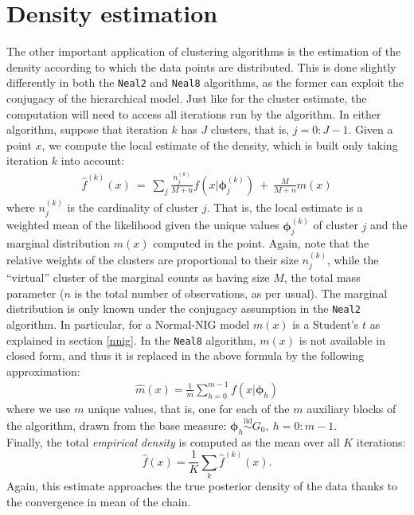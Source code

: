 \section{Density estimation}
The other important application of clustering algorithms is the estimation of the density according to which the data points are distributed.
This is done slightly differently in both the \verb|Neal2| and \verb|Neal8| algorithms, as the former can exploit the conjugacy of the hierarchical model.
Just like for the cluster estimate, the computation will need to access all iterations run by the algorithm.
In either algorithm, suppose that iteration $k$ has $J$ clusters, that is, $j=0:J-1$.
Given a point $x$, we compute the local estimate of the density, which is built only taking iteration $k$ into account:
\begin{equation}\label{localdens}
	\begin{aligned}
		\hat f^{(k)}(x) \ = \ \sum_j \frac{n^{(k)}_j}{M+n} f\left(x | \boldsymbol{\phi}^{(k)}_j\right) \ + \ \frac{M}{M+n} m(x)
	\end{aligned}
\end{equation}
where $n^{(k)}_j$ is the cardinality of cluster $j$.
That is, the local estimate is a weighted mean of the likelihood given the unique values $\boldsymbol{\phi}^{(k)}_j$ of cluster $j$ and the marginal distribution $m(x)$ computed in the point.
Again, note that the relative weights of the clusters are proportional to their size $n^{(k)}_j$, while the ``virtual'' cluster of the marginal counts as having size $M$, the total mass parameter ($n$ is the total number of observations, as per usual).
The marginal distribution is only known under the conjugacy assumption in the \verb|Neal2| algorithm.
In particular, for a Normal-NIG model $m(x)$ is a Student's $t$ as explained in section \ref{nnig}.
In the \verb|Neal8| algorithm, $m(x)$ is not available in closed form, and thus it is replaced in the above formula by the following approximation:
\begin{equation}\label{margneal8}
	\begin{aligned}
		\hat m(x) = \frac{1}{m} \sum_{h=0}^{m-1}  f\left(x | \boldsymbol{\phi}_h\right)
	\end{aligned}
\end{equation}
where we use $m$ unique values, that is, one for each of the $m$ auxiliary blocks of the algorithm, drawn from the base measure: $\boldsymbol{\phi}_{h} \overset{\text{iid}}{\sim} G_0, \ h=0:m-1$. \\
Finally, the total \emph{empirical density} is computed as the mean over all $K$ iterations:
$$
\hat f(x) = \frac{1}{K} \sum_k \hat f^{(k)}(x).
$$
Again, this estimate approaches the true posterior density of the data thanks to the convergence in mean of the chain.

